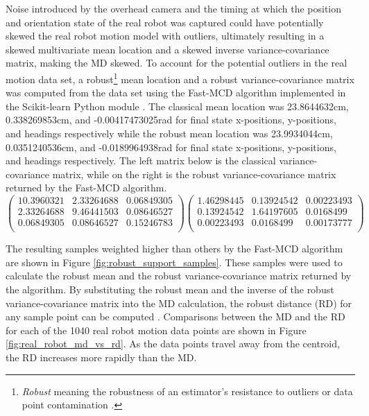 Noise introduced by the overhead camera and the timing at which the position and orientation state of the real robot was captured could have potentially skewed the real robot motion model with outliers, ultimately resulting in a skewed multivariate mean location and a skewed inverse variance-covariance matrix, making the MD skewed. To account for the potential outliers in the real motion data set, a robust\footnote{\textit{Robust} meaning the robustness of an estimator's resistance to outliers or data point contamination \cite{WICS:WICS61}.} mean location and a robust variance-covariance matrix was computed from the data set using the Fast-MCD algorithm implemented in the Scikit-learn Python module \cite{Rousseeuw:1999:FAM:331435.331458}\cite{scikit-learn}. The classical mean location was 23.8644632cm, 0.338269853cm, and -0.00417473025rad for final state x-positions, y-positions, and headings respectively while the robust mean location was 23.9934044cm, 0.0351240536cm, and -0.0189964938rad for final state x-positions, y-positions, and headings respectively. The left matrix below is the classical variance-covariance matrix, while on the right is the robust variance-covariance matrix returned by the Fast-MCD algorithm.
\vspace{-1mm}
\[ \left( \begin{array}{ccc}
10.3960321 &  2.33264688 & 0.06849305 \\
2.33264688 &  9.46441503 & 0.08646527 \\
0.06849305 &  0.08646527 & 0.15246783 \\
\end{array} \right)
%
\left( \begin{array}{ccc}
1.46298445 & 0.13924542 & 0.00223493 \\
0.13924542 & 1.64197605 & 0.0168499  \\
0.00223493 & 0.0168499  & 0.00173777 \\
\end{array} \right)
\]

\noindent
The resulting samples weighted higher than others by the Fast-MCD algorithm are shown in Figure \ref{fig:robust_support_samples}. These samples were used to calculate the robust mean and the robust variance-covariance matrix returned by the algorithm. By substituting the robust mean and the inverse of the robust variance-covariance matrix into the MD calculation, the robust distance (RD) for any sample point can be computed \cite{WICS:WICS61}. Comparisons between the MD and the RD for each of the 1040 real robot motion data points are shown in Figure \ref{fig:real_robot_md_vs_rd}. As the data points travel away from the centroid, the RD increases more rapidly than the MD.  

